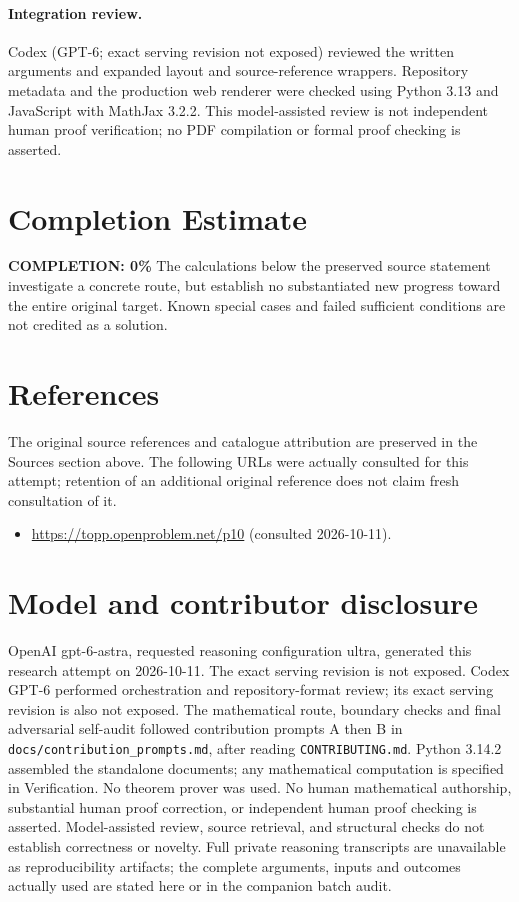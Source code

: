 \documentclass[11pt]{article}
\begin{document}
\paragraph{Integration review.} Codex (GPT-6; exact serving revision not exposed) reviewed the written arguments and expanded layout and source-reference wrappers. Repository metadata and the production web renderer were checked using Python 3.13 and JavaScript with MathJax 3.2.2. This model-assisted review is not independent human proof verification; no PDF compilation or formal proof checking is asserted.

\section{Completion Estimate}
\noindent\textbf{COMPLETION: 0\%}
The calculations below the preserved source statement investigate a concrete route,
but establish no substantiated new progress toward the entire original target.
Known special cases and failed sufficient conditions are not credited as a solution.
\section{References}
The original source references and catalogue attribution are preserved in the
Sources section above. The following URLs were actually consulted for this attempt;
retention of an additional original reference does not claim fresh consultation of it.
\begin{itemize}
\item \url{https://topp.openproblem.net/p10} (consulted 2026-10-11). 
\end{itemize}
\section{Model and contributor disclosure}
OpenAI gpt-6-astra, requested reasoning configuration ultra, generated this research
attempt on 2026-10-11. The exact serving revision is not exposed. Codex GPT-6
performed orchestration and repository-format review; its exact serving revision
is also not exposed. The mathematical route, boundary checks and final adversarial
self-audit followed contribution prompts A then B in
\texttt{docs/contribution\_prompts.md}, after reading \texttt{CONTRIBUTING.md}.
Python 3.14.2 assembled the standalone documents; any mathematical computation is
specified in Verification. No theorem prover was used. No human mathematical
authorship, substantial human proof correction, or independent human proof checking
is asserted. Model-assisted review, source retrieval, and structural checks do not
establish correctness or novelty. Full private reasoning transcripts are unavailable
as reproducibility artifacts; the complete arguments, inputs and outcomes actually
used are stated here or in the companion batch audit.
\end{document}
